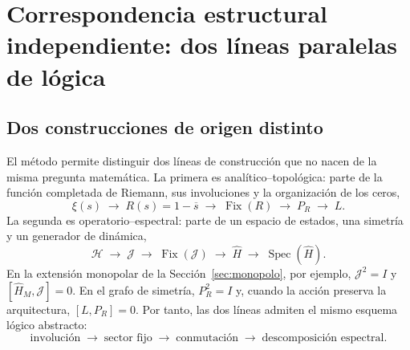 \documentclass[11pt]{amsart}
\theoremstyle{definition}
\theoremstyle{remark}
\begin{document}
\section{Correspondencia estructural independiente: dos líneas paralelas de lógica}\label{sec:correspondencia}

\subsection{Dos construcciones de origen distinto}
El método permite distinguir dos líneas de construcción que no nacen de la misma pregunta matemática. La primera es analítico--topológica: parte de la función completada de Riemann, sus involuciones y la organización de los ceros,
\begin{equation}\label{eq:lineaA}
 \xi(s)\;\longrightarrow\;R(s)=1-\overline{s}\;\longrightarrow\;
 \operatorname{Fix}(R)\;\longrightarrow\;P_R\;\longrightarrow\;L .
\end{equation}
La segunda es operatorio--espectral: parte de un espacio de estados, una simetría y un generador de dinámica,
\begin{equation}\label{eq:lineaB}
 \mathcal H\;\longrightarrow\;\mathcal J\;\longrightarrow\;
 \operatorname{Fix}(\mathcal J)\;\longrightarrow\;\widehat H\;\longrightarrow\;
 \operatorname{Spec}(\widehat H).
\end{equation}
En la extensión monopolar de la Sección~\ref{sec:monopolo}, por ejemplo, $\mathcal J^2=I$ y $[\widehat H_M,\mathcal J]=0$. En el grafo de simetría, $P_R^2=I$ y, cuando la acción preserva la arquitectura, $[L,P_R]=0$. Por tanto, las dos líneas admiten el mismo esquema lógico abstracto:
\begin{equation}\label{eq:parallelpattern}
 \boxed{\text{involución}\;\to\;\text{sector fijo}\;\to\;\text{conmutación}\;\to\;\text{descomposición espectral}.}
\end{equation}
\end{document}
